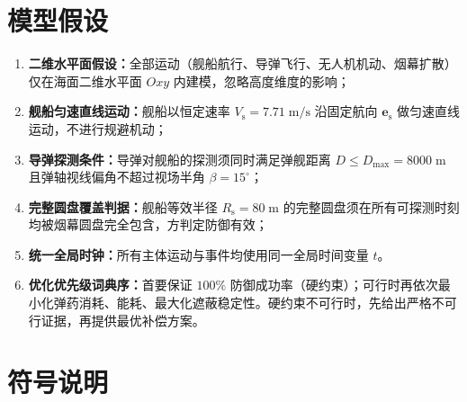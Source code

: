 \documentclass[withoutpreface,bwprint]{cumcmthesis}
\renewcommand{\textbf}[1]{{\song\bfseries #1}}
\begin{document}
\section{模型假设}
\begin{enumerate}[leftmargin=2em]
	\item \textbf{二维水平面假设：}全部运动（舰船航行、导弹飞行、无人机机动、烟幕扩散）仅在海面二维水平面 $Oxy$ 内建模，忽略高度维度的影响；
	\item \textbf{舰船匀速直线运动：}舰船以恒定速率 $V_{\mathrm{s}} = 7.71\;\text{m/s}$ 沿固定航向 $\bm{e}_{\mathrm{s}}$ 做匀速直线运动，不进行规避机动；
	\item \textbf{导弹探测条件：}导弹对舰船的探测须同时满足弹舰距离 $D \leq D_{\max}=8000\;\text{m}$ 且弹轴视线偏角不超过视场半角 $\beta=15^\circ$；
	\item \textbf{完整圆盘覆盖判据：}舰船等效半径 $R_{\mathrm{s}}=80\;\text{m}$ 的完整圆盘须在所有可探测时刻均被烟幕圆盘完全包含，方判定防御有效；
	\item \textbf{统一全局时钟：}所有主体运动与事件均使用同一全局时间变量 $t$。
\item \textbf{优化优先级词典序：}首要保证 $100\%$ 防御成功率（硬约束）；可行时再依次最小化弹药消耗、能耗、最大化遮蔽稳定性。硬约束不可行时，先给出严格不可行证据，再提供最优补偿方案。
\end{enumerate}



\section{符号说明}




	
\end{document}
